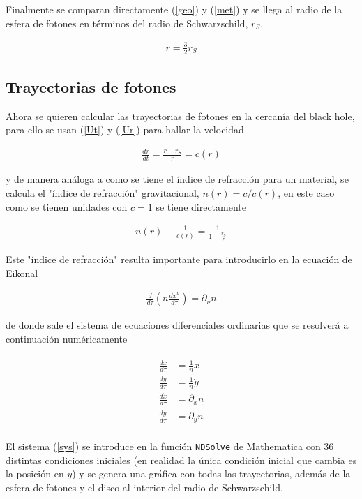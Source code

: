 \documentclass[%
 reprint,
 amsmath,amssymb,
 aps,
floatfix,
]{revtex4-1}
\begin{document}
Finalmente se comparan directamente (\ref{geo}) y (\ref{met}) y se llega al radio de la esfera de fotones en términos del radio de Schwarzschild, $r_S$,

\begin{align}
    r = \frac{3}{2}r_S
\end{align}

\subsection{Trayectorias de fotones}

Ahora se quieren calcular las trayectorias de fotones en la cercanía del black hole, para ello se usan (\ref{Ut}) y (\ref{Ur}) para hallar la velocidad

\begin{align}
    \frac{dr}{dt} = \frac{r-r_S}{r} = c(r)
\end{align}

y de manera análoga a como se tiene el índice de refracción para un material, se calcula el "índice de refracción" gravitacional, $n(r) = c/c(r)$, en este caso como se tienen unidades con $c=1$ se tiene directamente

\begin{align}
    n(r) \equiv \frac{1}{c(r)} = \frac{1}{1-\frac{r_S}{r}}
\end{align}

Este "índice de refracción" resulta importante para introducirlo en la ecuación de Eikonal

\begin{align}
    \frac{d}{d\tau}\left(n\frac{dx^\nu}{d\tau}\right) = \partial_\nu n
\end{align}

de donde sale el sistema de ecuaciones diferenciales ordinarias que se resolverá a continuación numéricamente

\begin{align}\label{sys}
    \begin{split}
    \frac{dx}{d\tau} &= \frac{1}{n}\dot{x}\\
    \frac{dy}{d\tau} &= \frac{1}{n}\dot{y}\\
    \frac{d\dot{x}}{d\tau} &= \partial_xn\\
    \frac{d\dot{y}}{d\tau} &= \partial_yn
    \end{split}
\end{align}

El sistema (\ref{sys}) se introduce en la función \texttt{NDSolve} de Mathematica\textsuperscript{\textregistered} con 36 distintas condiciones iniciales (en realidad la única condición inicial que cambia es la posición en $y$) y se genera una gráfica con todas las trayectorias, además de la esfera de fotones y el disco al interior del radio de Schwarzschild.
\end{document}
